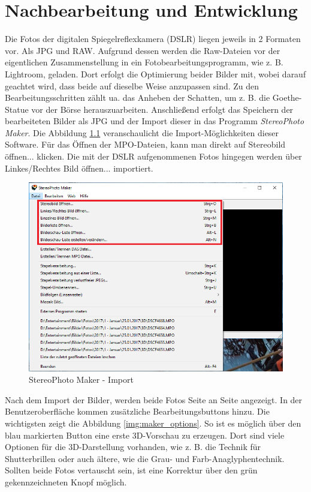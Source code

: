 \documentclass[liststotoc,bibtotoc,fontsize=14pt,]{scrreprt}
\begin{document}
	\chapter{Nachbearbeitung und Entwicklung}
		Die Fotos der digitalen Spiegelreflexkamera (DSLR) liegen jeweils in 2 Formaten vor. Als JPG und RAW. Aufgrund dessen werden die Raw-Dateien vor der eigentlichen Zusammenstellung in ein Fotobearbeitungsprogramm, wie z. B. Lightroom, geladen. Dort erfolgt die Optimierung beider Bilder mit, wobei darauf geachtet wird, dass beide auf dieselbe Weise anzupassen sind. Zu den Bearbeitungsschritten zählt ua. das Anheben der Schatten, um z. B. die Goethe-Statue vor der Börse herauszuarbeiten. Anschließend erfolgt das Speichern der bearbeiteten Bilder als JPG und der Import dieser in das Programm \textit{StereoPhoto Maker}.
		\newpage
		Die Abbildung \ref{img:maker_import} veranschaulicht die Import-Möglichkeiten dieser Software. Für das Öffnen der MPO-Dateien, kann man direkt auf \grqq{}Stereobild öffnen...\grqq{} klicken. Die mit der DSLR aufgenommenen Fotos hingegen werden über \grqq{}Linkes/Rechtes Bild öffnen...\grqq{} importiert.
		\begin{figure}[H]
			\includegraphics[width=\linewidth]{img/steps/step1.png}
			\caption{StereoPhoto Maker - Import}
			\label{img:maker_import}
		\end{figure}
	
		Nach dem Import der Bilder, werden beide Fotos Seite an Seite angezeigt. In der Benutzeroberfläche kommen zusätzliche Bearbeitungsbuttons hinzu. Die wichtigsten zeigt die Abbildung \ref{img:maker_options}. So ist es möglich über den blau markierten Button eine erste 3D-Vorschau zu erzeugen. Dort sind viele Optionen für die 3D-Darstellung vorhanden, wie z. B. die Technik für Shutterbrillen oder auch ältere, wie die Grau- und Farb-Anaglyphentechnik. Sollten beide Fotos vertauscht sein, ist eine Korrektur über den grün gekennzeichneten Knopf möglich.
				
\end{document}
